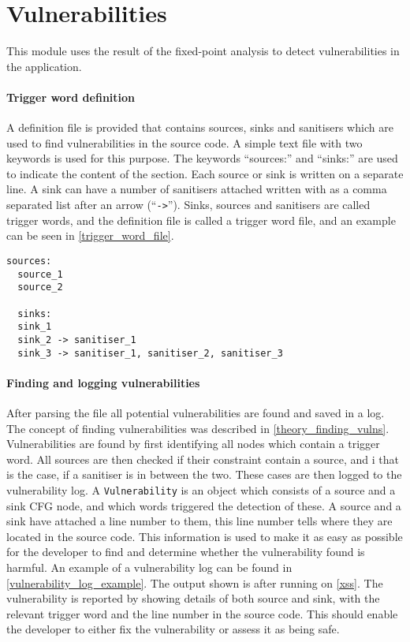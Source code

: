 \section{Vulnerabilities}\label{impl:vulnerabilities}
This module uses the result of the fixed-point analysis to detect vulnerabilities in the application.

\paragraph{Trigger word definition}
A definition file is provided that contains sources, sinks and sanitisers which are used to find vulnerabilities in the source code.
A simple text file with two keywords  is used for this purpose.
The keywords ``sources:'' and ``sinks:'' are used to indicate the content of the section.
Each source or sink is written on a separate line.
A sink can have a number of sanitisers attached written with as a comma separated list after an arrow (``\texttt{->}'').
Sinks, sources and sanitisers are called trigger words, and the definition file is called a trigger word file, and an example can be seen in \cref{trigger_word_file}.
\begin{lstlisting}[style=default, caption={How the trigger word file should be defined.}, label={trigger_word_file}]
  sources:
  source_1
  source_2

  sinks:
  sink_1
  sink_2 -> sanitiser_1
  sink_3 -> sanitiser_1, sanitiser_2, sanitiser_3
\end{lstlisting}

\paragraph{Finding and logging vulnerabilities}
After parsing the file all potential vulnerabilities are found and saved in a log.
The concept of finding vulnerabilities was described in \cref{theory_finding_vulns}.
Vulnerabilities are found by first identifying all nodes which contain a trigger word.
All sources are then checked if their constraint contain a source, and i that is the case, if a sanitiser is in between the two.
These cases are then logged to the vulnerability log.
A \texttt{Vulnerability} is an object which consists of a source and a sink CFG node, and which words triggered the detection of these.
A source and a sink have attached a line number to them, this line number tells where they are located in the source code.
This information is used to make it as easy as possible for the developer to find and determine whether the vulnerability found is harmful.
An example of a vulnerability log can be found in \cref{vulnerability_log_example}.
The output shown is after running \pyt{} on \cref{xss}.
The vulnerability is reported by showing details of both source and sink, with the relevant trigger word and the line number in the source code.
This should enable the developer to either fix the vulnerability or assess it as being safe.

